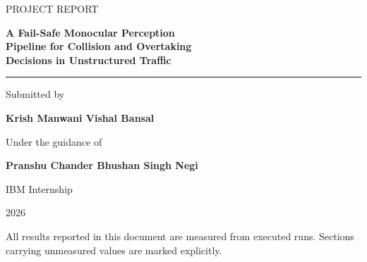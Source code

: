 \documentclass[11pt,a4paper]{report}
\begin{document}
\begin{titlepage}
\centering
\vspace*{2.2cm}

{\sffamily\Large PROJECT REPORT\par}
\vspace{1.4cm}

{\sffamily\huge\bfseries A Fail-Safe Monocular Perception\\[0.25em]
Pipeline for Collision and Overtaking\\[0.25em]
Decisions in Unstructured Traffic\par}

\vspace{1.6cm}
\rule{0.55\textwidth}{0.4pt}
\vspace{1.6cm}

{\large Submitted by\par}
\vspace{0.5em}
{\large\bfseries Krish Manwani \quad\textbullet\quad Vishal Bansal\par}

\vspace{1.4cm}
{\large Under the guidance of\par}
\vspace{0.5em}
{\large\bfseries Pranshu Chander \quad\textbullet\quad Bhushan Singh Negi\par}

\vspace{2.4cm}
{\large IBM Internship\par}
\vspace{0.35em}
{\large 2026\par}

\vfill
{\footnotesize All results reported in this document are measured from
executed runs. Sections carrying unmeasured values are marked explicitly.\par}
\end{titlepage}

\setcounter{page}{1}

\tableofcontents
\clearpage
\listoffigures
\vspace{1.5em}
\listoftables
\clearpage

\end{document}
